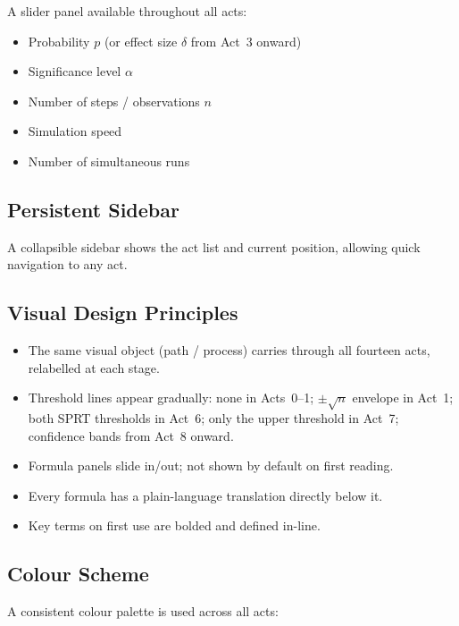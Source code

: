 \documentclass[12pt, a4paper]{article}
\begin{document}
A slider panel available throughout all acts:
\begin{itemize}[nosep]
  \item Probability $p$ (or effect size $\delta$ from Act~3 onward)
  \item Significance level $\alpha$
  \item Number of steps / observations $n$
  \item Simulation speed
  \item Number of simultaneous runs
\end{itemize}

\subsection{Persistent Sidebar}

A collapsible sidebar shows the act list and current position, allowing
quick navigation to any act.

\subsection{Visual Design Principles}

\begin{itemize}[nosep]
  \item The same visual object (path / process) carries through all fourteen
        acts, relabelled at each stage.
  \item Threshold lines appear gradually: none in Acts~0--1; $\pm\sqrt{n}$
        envelope in Act~1; both SPRT thresholds in Act~6; only the upper
        threshold in Act~7; confidence bands from Act~8 onward.
  \item Formula panels slide in/out; not shown by default on first reading.
  \item Every formula has a plain-language translation directly below it.
  \item Key terms on first use are bolded and defined in-line.
\end{itemize}

\subsection{Colour Scheme}

A consistent colour palette is used across all acts:
\end{document}
